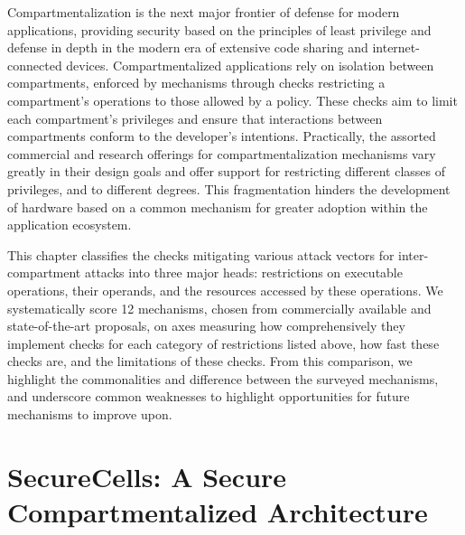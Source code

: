 \documentclass[lablogo]{thesis}
\newcommand{\nmechs}{12\xspace}
\begin{document}
Compartmentalization is the next major frontier of defense for 
modern applications, providing security based on the principles of 
least privilege and defense in depth
in the modern era of extensive code sharing and internet-connected devices.
Compartmentalized applications rely on isolation between compartments,
enforced by mechanisms through checks restricting a compartment's operations 
to those allowed by a policy.
These checks aim to limit each compartment's privileges and ensure that 
interactions between compartments conform to the developer's intentions.
Practically, the assorted commercial and research offerings for 
compartmentalization mechanisms vary greatly in their design goals and 
offer support for restricting different classes of privileges, and to
different degrees.
This fragmentation hinders the development of hardware based on a
common mechanism for greater adoption within the application ecosystem.


This chapter classifies the checks mitigating various attack vectors 
for inter-compartment attacks into three major heads:
restrictions on executable operations, their operands, and the resources 
accessed by these operations.
We systematically score \nmechs{} mechanisms, 
chosen from commercially available and state-of-the-art proposals, 
on axes measuring how comprehensively they implement checks for each 
category of restrictions listed above, how fast these checks are,
and the limitations of these checks.
From this comparison, we highlight the commonalities and difference
between the surveyed mechanisms, and underscore common weaknesses
to highlight opportunities for future mechanisms to improve upon.


\chapter{SecureCells: A Secure Compartmentalized Architecture}
\label{ch:seccells}
\end{document}
